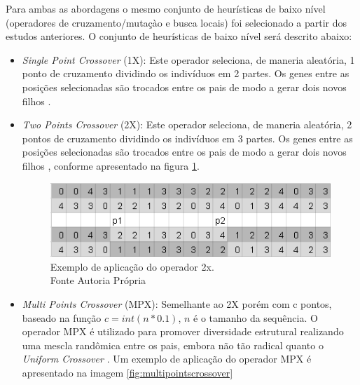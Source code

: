 Para ambas as abordagens o mesmo conjunto de heurísticas de baixo nível (operadores de cruzamento/mutaçào e busca locais) foi selecionado a partir dos estudos anteriores. O conjunto de heurísticas de baixo nível será descrito abaixo:

 \begin{itemize}
 	
 		\item \textit{Single Point Crossover} (1X): Este operador seleciona, de maneria aleatória, 1 ponto de cruzamento dividindo os indivíduos em 2 partes. Os genes entre as posições selecionadas são trocados entre os pais de modo a gerar dois novos filhos \cite{benitez2015algoritmo}.
 	
 	\item \textit{Two Points Crossover} (2X): Este operador seleciona, de maneria aleatória, 2 pontos de cruzamento dividindo os indivíduos em 3 partes. Os genes entre as posições selecionadas são trocados entre os pais de modo a gerar dois novos filhos \cite{benitez2015algoritmo}, conforme apresentado na figura \ref{fig:twopointscrossover}.
 	
 	
 	\begin{figure}[!htb]
 		\centering
 		\includegraphics{Imagens/TwoPointsCrossover.png}
 		\caption{Exemplo de aplicação do operador 2x. \\Fonte Autoria Própria}
 		\label{fig:twopointscrossover}
 	\end{figure}
 	
 	
 	
 	
 	\item \textit{Multi Points Crossover} (MPX): Semelhante ao 2X porém com c pontos, baseado na função $c = int(n * 0.1)$, $n$ é o tamanho da sequência. O operador MPX é utilizado para promover diversidade estrutural realizando uma mescla randômica entre os pais, embora não tão radical quanto o \textit{Uniform  Crossover} \cite{sabar2014automatic}. Um exemplo de aplicação do operador MPX é apresentado na imagem \ref{fig:multipointscrossover}
 	

\end{itemize}
